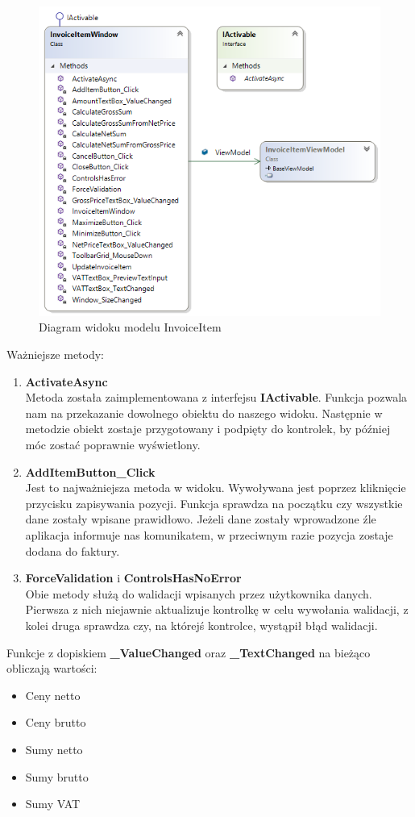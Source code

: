 \newpage
\begin{figure}[ht!]
\centering
  \includegraphics[width=0.7\linewidth]{Rysunki/InvoiceItemWindowDiagram.png}
  \caption{Diagram widoku modelu InvoiceItem}
  \label{fig:InvoiceItemWindowDiagram}
\end{figure}

Ważniejsze metody:
\begin{enumerate}
    \item \textbf{ActivateAsync} \\
    Metoda została zaimplementowana z interfejsu \textbf{IActivable}. Funkcja pozwala nam na przekazanie dowolnego obiektu do naszego widoku. Następnie w metodzie obiekt zostaje przygotowany i podpięty do kontrolek, by później móc zostać poprawnie wyświetlony. 
    \item \textbf{AddItemButton\_Click}\\
    Jest to najważniejsza metoda w widoku. Wywoływana jest poprzez kliknięcie przycisku zapisywania pozycji. Funkcja sprawdza na początku czy wszystkie dane zostały wpisane prawidłowo. Jeżeli dane zostały wprowadzone źle aplikacja informuje nas komunikatem, w przeciwnym razie pozycja zostaje dodana do faktury.
    \item \textbf{ForceValidation} i \textbf{ControlsHasNoError} \\
    Obie metody służą do walidacji wpisanych przez użytkownika danych. Pierwsza z nich niejawnie aktualizuje kontrolkę w celu wywołania walidacji, z kolei druga sprawdza czy, na którejś kontrolce, wystąpił błąd walidacji.
\end{enumerate}

Funkcje z dopiskiem \textbf{\_ValueChanged} oraz \textbf{\_TextChanged} na bieżąco obliczają wartości: 
\begin{itemize}
    \item Ceny netto
    \item Ceny brutto
    \item Sumy netto
    \item Sumy brutto
    \item Sumy VAT
\end{itemize}

